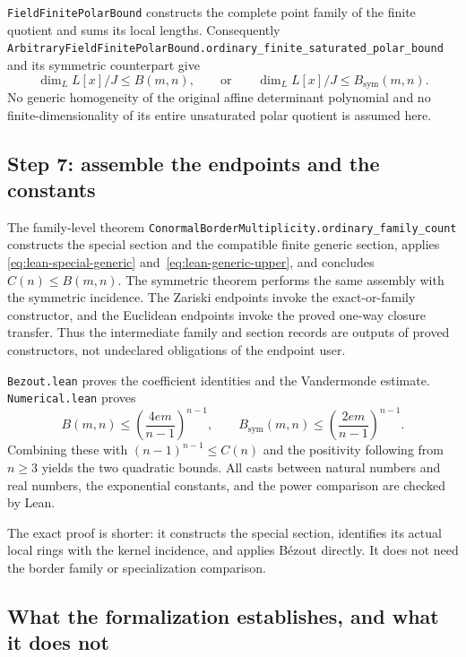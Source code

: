 \nolinkurl{FieldFinitePolarBound} constructs the complete point family
of the finite quotient and sums its local lengths.  Consequently
\nolinkurl{ArbitraryFieldFinitePolarBound.ordinary_finite_saturated_polar_bound}
and its symmetric counterpart give
\begin{equation}
 \label{eq:lean-generic-upper}
 \dim_L L[x]/J\leq B(m,n),
 \qquad\text{or}\qquad
 \dim_L L[x]/J\leq B_{\mathrm{sym}}(m,n).
\end{equation}
No generic homogeneity of the original affine determinant polynomial and
no finite-dimensionality of its entire unsaturated polar quotient is
assumed here.

\subsection{Step 7: assemble the endpoints and the constants}
\label{app:lean-assembly}

The family-level theorem
\nolinkurl{ConormalBorderMultiplicity.ordinary_family_count} constructs
the special section and the compatible finite generic section, applies
\eqref{eq:lean-special-generic} and~\eqref{eq:lean-generic-upper}, and
concludes $C(n)\leq B(m,n)$.  The symmetric theorem performs the same
assembly with the symmetric incidence.  The Zariski endpoints invoke
the exact-or-family constructor, and the Euclidean endpoints invoke the
proved one-way closure transfer.  Thus the intermediate family and section
records are outputs of proved constructors, not undeclared obligations
of the endpoint user.

\nolinkurl{Bezout.lean} proves the coefficient identities and the
Vandermonde estimate.  \nolinkurl{Numerical.lean} proves
\[
 B(m,n)\leq\left(\frac{4em}{n-1}\right)^{n-1},
 \qquad
 B_{\mathrm{sym}}(m,n)
 \leq\left(\frac{2em}{n-1}\right)^{n-1}.
\]
Combining these with $(n-1)^{n-1}\leq C(n)$ and the positivity following
from $n\geq3$ yields the two quadratic bounds.  All casts between natural
numbers and real numbers, the exponential constants, and the power
comparison are checked by Lean.

The exact proof is shorter: it constructs the special section, identifies
its actual local rings with the kernel incidence, and applies B\'ezout
directly.  It does not need the border family or specialization comparison.

\subsection{What the formalization establishes, and what it does not}
\label{app:lean-scope}

